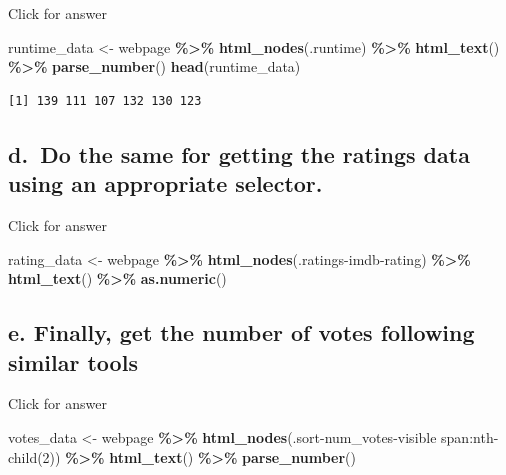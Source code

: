 \documentclass[
]{book}
\newenvironment{Shaded}{\begin{snugshade}}{\end{snugshade}}
\newcommand{\FunctionTok}[1]{\textcolor[rgb]{0.13,0.29,0.53}{\textbf{#1}}}
\newcommand{\NormalTok}[1]{#1}
\newcommand{\OtherTok}[1]{\textcolor[rgb]{0.56,0.35,0.01}{#1}}
\newcommand{\SpecialCharTok}[1]{\textcolor[rgb]{0.81,0.36,0.00}{\textbf{#1}}}
\newcommand{\StringTok}[1]{\textcolor[rgb]{0.31,0.60,0.02}{#1}}
\begin{document}
Click for answer

\begin{Shaded}
\begin{Highlighting}[]
\NormalTok{runtime\_data }\OtherTok{\textless{}{-}}\NormalTok{ webpage }\SpecialCharTok{\%\textgreater{}\%} 
  \FunctionTok{html\_nodes}\NormalTok{(}\StringTok{\textquotesingle{}.runtime\textquotesingle{}}\NormalTok{) }\SpecialCharTok{\%\textgreater{}\%} 
  \FunctionTok{html\_text}\NormalTok{() }\SpecialCharTok{\%\textgreater{}\%} 
  \FunctionTok{parse\_number}\NormalTok{()}
\FunctionTok{head}\NormalTok{(runtime\_data)}
\end{Highlighting}
\end{Shaded}

\begin{verbatim}
[1] 139 111 107 132 130 123
\end{verbatim}

\hypertarget{d.-do-the-same-for-getting-the-ratings-data-using-an-appropriate-selector.}{%
\subsection{d.~Do the same for getting the ratings data using an appropriate selector.}\label{d.-do-the-same-for-getting-the-ratings-data-using-an-appropriate-selector.}}

Click for answer

\begin{Shaded}
\begin{Highlighting}[]
\NormalTok{rating\_data }\OtherTok{\textless{}{-}}\NormalTok{ webpage }\SpecialCharTok{\%\textgreater{}\%} 
  \FunctionTok{html\_nodes}\NormalTok{(}\StringTok{\textquotesingle{}.ratings{-}imdb{-}rating\textquotesingle{}}\NormalTok{) }\SpecialCharTok{\%\textgreater{}\%} 
  \FunctionTok{html\_text}\NormalTok{() }\SpecialCharTok{\%\textgreater{}\%} 
  \FunctionTok{as.numeric}\NormalTok{()}
\end{Highlighting}
\end{Shaded}

\hypertarget{e.-finally-get-the-number-of-votes-following-similar-tools}{%
\subsection{e. Finally, get the number of votes following similar tools}\label{e.-finally-get-the-number-of-votes-following-similar-tools}}

Click for answer

\begin{Shaded}
\begin{Highlighting}[]
\NormalTok{votes\_data }\OtherTok{\textless{}{-}}\NormalTok{ webpage }\SpecialCharTok{\%\textgreater{}\%} 
  \FunctionTok{html\_nodes}\NormalTok{(}\StringTok{\textquotesingle{}.sort{-}num\_votes{-}visible span:nth{-}child(2)\textquotesingle{}}\NormalTok{) }\SpecialCharTok{\%\textgreater{}\%} 
  \FunctionTok{html\_text}\NormalTok{() }\SpecialCharTok{\%\textgreater{}\%} 
  \FunctionTok{parse\_number}\NormalTok{()}
\end{Highlighting}
\end{Shaded}
\end{document}
